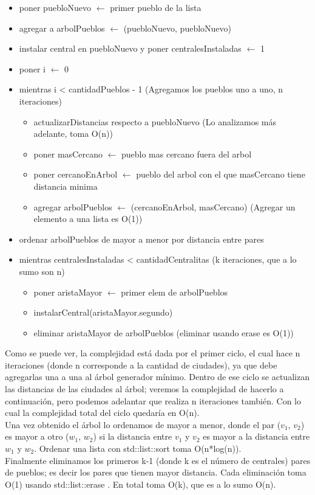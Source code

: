 \begin{itemize}
\item poner puebloNuevo $\leftarrow$ primer pueblo de la lista
\item agregar a arbolPueblos $\leftarrow$ (puebloNuevo, puebloNuevo)
\item instalar central en puebloNuevo y poner centralesInstaladas $\leftarrow$ 1
\item poner i $\leftarrow$ 0
\item mientras i < cantidadPueblos - 1 (Agregamos los pueblos uno a uno, n iteraciones)
\begin{itemize}
	\item actualizarDistancias respecto a puebloNuevo (Lo analizamos m\'as adelante, toma O(n))
	\item poner masCercano $\leftarrow$ pueblo mas cercano fuera del arbol
	\item poner cercanoEnArbol $\leftarrow$ pueblo del arbol con el que masCercano tiene distancia minima
	\item agregar arbolPueblos $\leftarrow$ (cercanoEnArbol, masCercano) (Agregar un elemento a una lista es O(1))
\end{itemize}
\item ordenar arbolPueblos de mayor a menor por distancia entre pares 
\item mientras centralesInstaladas < cantidadCentralitas (k iteraciones, que a lo sumo son n)
\begin{itemize}
	\item poner aristaMayor $\leftarrow$ primer elem de arbolPueblos
	\item instalarCentral(aristaMayor.segundo)
	\item eliminar aristaMayor de arbolPueblos (eliminar usando erase es O(1))
\end{itemize}
\end{itemize}

Como se puede ver, la complejidad est\'a dada por el primer ciclo, el cual hace n iteraciones (donde n corresponde a la cantidad de ciudades), ya que debe agregarlas una a una al \'arbol generador m\'inimo. Dentro de ese ciclo se actualizan las distancias de las ciudades al \'arbol; veremos la complejidad de hacerlo a continuaci\'on, pero podemos adelantar que realiza n iteraciones tambi\'en. Con lo cual la complejidad total del ciclo quedar\'ia en O(n).\\
Una vez obtenido el \'arbol lo ordenamos de mayor a menor, donde el par ($v_1$, $v_2$) es mayor a otro ($w_1$, $w_2$) si la distancia entre $v_1$ y $v_2$ es mayor a la distancia entre $w_1$ y $w_2$. Ordenar una lista con std::list::sort toma O(n*log(n)). \cite{sort}\\
Finalmente eliminamos los primeros k-1 (donde k es el n\'umero de centrales) pares de pueblos; es decir los pares que tienen mayor distancia. Cada eliminaci\'on toma O(1) usando std::list::erase \cite{erase}. En total toma O(k), que es a lo sumo O(n).\\

